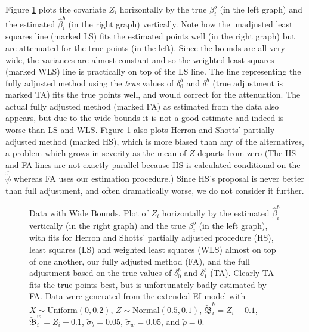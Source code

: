 \documentclass[11pt,titlepage]{article}
\newcommand{\bbeta}{{\mathfrak B}}
\newcommand{\sigmau}{\breve{\sigma}}
\newcommand{\rhou}{\breve{\rho}}
\newcommand{\psiu}{\breve{\psi}}
\begin{document}
Figure \ref{f:wide} plots the covariate $Z_i$ horizontally by the true
$\beta_i^b$ (in the left graph) and the estimated $\hat\beta_i^b$ (in
the right graph) vertically.  Note how the unadjusted least squares
line (marked LS) fits the estimated points well (in the right graph)
but are attenuated for the true points (in the left).  Since the
bounds are all very wide, the variances are almost constant and so the
weighted least squares (marked WLS) line is practically on top of the
LS line.  The line representing the fully adjusted method using the
\emph{true} values of $\delta_0^b$ and $\delta_1^b$ (true adjustment
is marked TA) fits the true points well, and would correct for the
attenuation.  The actual fully adjusted method (marked FA) as
estimated from the data also appears, but due to the wide bounds it is
not a good estimate and indeed is worse than LS and WLS.  Figure
\ref{f:wide} also plots Herron and Shotts' partially adjusted method
(marked HS), which is more biased than any of the alternatives, a
problem which grows in severity as the mean of $Z$ departs from zero
(The HS and FA lines are not exactly parallel because HS is calculated
conditional on the $\hat\psiu$ whereas FA uses our estimation
procedure.)  Since HS's proposal is never better than full adjustment,
and often dramatically worse, we do not consider it further.
\begin{figure}[t]
  \begin{center}
    \caption{Data with Wide Bounds. Plot of $Z_i$ horizontally by
      the estimated $\hat\beta_i^b$ vertically (in the right graph)
      and the true $\beta_i^b$ (in the left graph), with fits for
      Herron and Shotts' partially adjusted procedure (HS), least
      squares (LS) and weighted least squares (WLS) almost on top of
      one another, our fully adjusted method (FA), and the full
      adjustment based on the true values of $\delta_0^b$ and
      $\delta_1^b$ (TA).  Clearly TA fits the true points best, but is
      unfortunately badly estimated by FA.  Data were generated from
      the extended EI model with $X \sim \textrm{Uniform}(0,0.2)$, $Z
      \sim \textrm{Normal}(0.5,0.1)$, $\breve\bbeta_i^b = Z_i - 0.1$,
      $\breve\bbeta_i^w = Z_i - 0.1$, $\sigmau_b = 0.05$, $\sigmau_w =
      0.05$, and $\rhou = 0$.}
    \label{f:wide}
  \end{center}
\end{figure}
\end{document}

